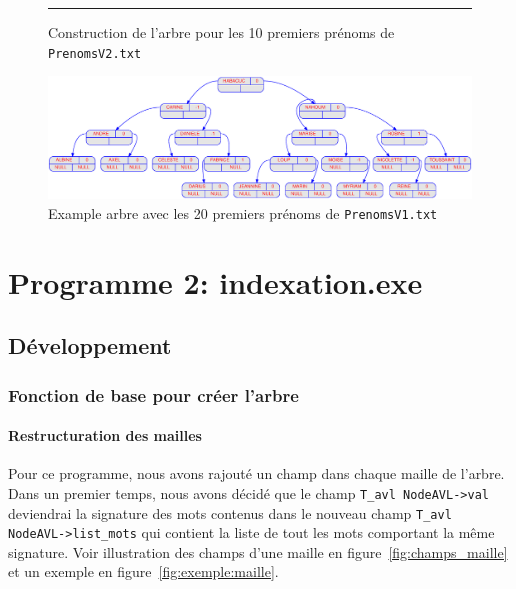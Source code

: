 \documentclass{article} %
\begin{document}
\begin{figure}[p]
\begin{center}
      \rule{\linewidth}{.5pt} %
   
    
  \end{center}
  
  \caption{Construction de l'arbre pour les 10 premiers prénoms de \texttt{PrenomsV2.txt}}
  \label{fig:prog1_1}
\end{figure}

\begin{figure}[p]
  \begin{center}
    \includegraphics[scale=0.25]{Img_prog1/displayAVL_20.eps}
  \end{center}
  \caption{Example arbre avec les 20 premiers prénoms de \texttt{PrenomsV1.txt}}
\end{figure}

\section{Programme 2: indexation.exe}
\subsection{Développement}


\subsubsection{Fonction de base pour créer l'arbre}
\paragraph{Restructuration des mailles} Pour ce programme, nous avons rajouté un champ dans chaque maille de l'arbre. Dans un premier temps, nous avons décidé que le champ \texttt{T\_avl NodeAVL->val} deviendrai la signature des mots contenus dans le nouveau champ \texttt{T\_avl NodeAVL->list\_mots} qui contient la liste de tout les mots comportant la même signature. Voir illustration des champs d'une maille en figure~\ref{fig:champs_maille} et un exemple en figure~\ref{fig:exemple:maille}.
\end{document}
